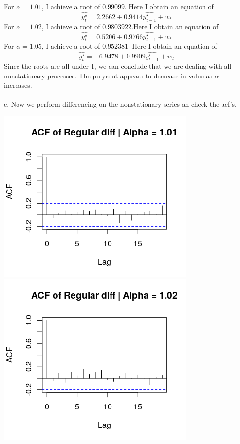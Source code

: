 \documentclass[11pt]{article}
\begin{document}
For $\alpha = 1.01$, I achieve a root of $0.99099$. Here I obtain an equation of $$ \hat{y_t^\star} = 2.2662 + 0.9414 \hat{y_{t-1}^\star} + w_t $$
For $\alpha = 1.02$, I achieve a root of $0.9803922$.Here I obtain an equation of $$ \hat{y_t^\star} = 0.5206 + 0.9766 \hat{y_{t-1}^\star} + w_t $$
For $\alpha = 1.05$, I achieve a root of $0.952381$. Here I obtain an equation of $$ \hat{y_t^\star} = -6.9478 + 0.9909 \hat{y_{t-1}^\star} + w_t $$
Since the roots are all under 1, we can conclude that we are dealing with all nonstationary processes. The polyroot appears to decrease in value as $\alpha$ increases.
\\\\
c. Now we perform differencing on the nonstationary series an check the acf's.
\begin{center}
\includegraphics[scale=.75]{1c1}
\includegraphics[scale=.75]{1c2}\\

\end{center}
\end{document}
